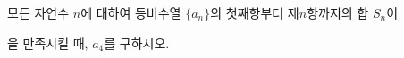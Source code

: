 모든 자연수 $n$에 대하여 등비수열 $\{a_n\}$의 첫째항부터 제$n$항까지의 합 $S_n$이\par\smallskip{}\par\smallskip\noindent 을 만족시킬 때, $a_4$를 구하시오.
